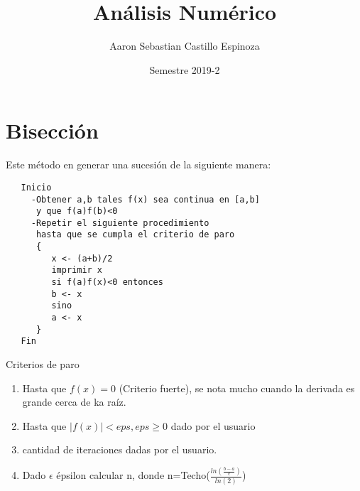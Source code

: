 \documentclass{article}
\title{Análisis Numérico}
\author{Aaron Sebastian Castillo Espinoza }
\date{Semestre 2019-2}
\begin{document}
\maketitle
\section{Bisección}
Este método en generar una sucesión de la siguiente manera:\\
\begin{verbatim}
   Inicio
     -Obtener a,b tales f(x) sea continua en [a,b]
      y que f(a)f(b)<0
     -Repetir el siguiente procedimiento
      hasta que se cumpla el criterio de paro 
      {
         x <- (a+b)/2
         imprimir x
         si f(a)f(x)<0 entonces
         b <- x
         sino 
         a <- x
      }   
   Fin   
\end{verbatim} 

Criterios de paro\\ 
\begin{enumerate}
    \item Hasta que $f(x)=0$ (Criterio fuerte), se nota mucho cuando la derivada es grande cerca de ka raíz. 
    \item Hasta que $|f(x)| <eps, eps\ge0 $ dado por el usuario 
    \item cantidad de iteraciones dadas por el usuario.
    \item Dado $\epsilon$ épsilon calcular n, donde n=Techo($\frac{ln(\frac {b-a}{\epsilon})}{ln(2)}$) 
\end{enumerate}
\end{document}
